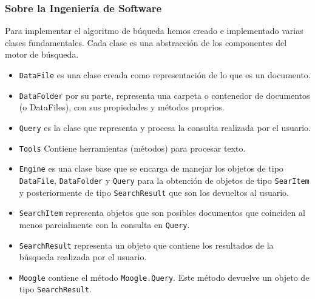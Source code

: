 \documentclass[12pt]{beamer}
\begin{document}
\begin{frame}
\frametitle{Sobre la Ingeniería de Software}

Para implementar el algoritmo de búqueda hemos creado e implementado varias clases fundamentales. Cada clase es una abstracción de los componentes del motor de búsqueda.

\begin{itemize}
\item \texttt{DataFile} es una clase creada como representación de lo que es un documento.
\item \texttt{DataFolder} por su parte, representa una carpeta o contenedor de documentos (o DataFiles), con sus propiedades y métodos proprios.
\item \texttt{Query} es la clase que representa y procesa la consulta realizada por el usuario.
\item \texttt{Tools} Contiene herramientas (métodos) para procesar texto.
\end{itemize}
\end{frame}

\begin{frame}
\begin{itemize}
\item \texttt{Engine} es una clase base que se encarga de manejar los objetos de tipo \texttt{DataFile}, \texttt{DataFolder} y \texttt{Query} para la obtención de objetos de tipo \texttt{SearItem} y posteriormente de tipo \texttt{SearchResult} que son los devueltos al usuario.
\item \texttt{SearchItem} representa objetos que son posibles documentos que coinciden al menos parcialmente con la consulta en \texttt{Query}.
\item \texttt{SearchResult} representa un objeto que contiene los resultados de la búsqueda realizada por el usuario.
\item \texttt{Moogle} contiene el método \texttt{Moogle.Query}. Este método devuelve un objeto de tipo \texttt{SearchResult}.
\end{itemize}
\end{frame}
\end{document}
